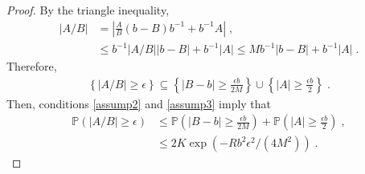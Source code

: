 \documentclass{article}
\def\eqsp{\,}
\def\eqsp{\;}
\newcommand{\1}{\mathds{1}}
\begin{document}
\begin{proof}
By the triangle inequality,
\begin{align*}
    \left|A/B\right| &= \left| \frac{A}{B} (b - B) b^{-1}  + b^{-1}A\right|\eqsp,\\
    &\leq b^{-1}\left| A/B\right| \left|b - B\right| + b^{-1} \left|A\right| \leq Mb^{-1}\left|b - B\right| + b^{-1}\left|A\right|\eqsp.
\end{align*}
Therefore,
\begin{align*}
    \left\{ \left|A/B\right| \geq \epsilon \right\} \subseteq \left\{ \left|B - b\right| \geq \frac{\epsilon b}{2M}\right\} \cup \left\{ |A| \geq \frac{\epsilon b}{2}\right\}\eqsp.
\end{align*}
Then, conditions \ref{assump2} and \ref{assump3} imply that
\begin{align*}
    \mathbb{P}\left( |A/B| \geq \epsilon \right) & \leq \mathbb{P}\left(\left|B - b\right| \geq \frac{\epsilon b}{2M}\right) + \mathbb{P}\left(|A| \geq \frac{\epsilon b}{2}\right)\eqsp, \\
    &\leq 2K \exp(-R b^2\epsilon^2/(4M^2))\eqsp.
\end{align*}
\end{proof}
\end{document}
